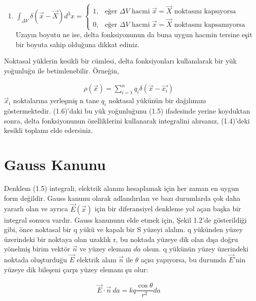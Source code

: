\begin{enumerate}
  \item $\int_{\Delta V} \delta(\Vec{x} - \Vec{X}) d^{3}x =   \begin{cases}
      1, & \text{eğer $\Delta V$ hacmi $\Vec{x} = \Vec{X}$ noktasını kapsıyorsa}\\
      0, & \text{eğer $\Delta V$ hacmi $\Vec{x} = \Vec{X}$ noktasını kapsamıyorsa}
    \end{cases}   $ \\
    Uzayın boyutu ne ise, delta fonksiyonunun da buna uygun hacmin tersine eşit bir boyuta sahip olduğuna dikkat ediniz.

\end{enumerate}

    Noktasal yüklerin kesikli bir cümlesi, delta fonksiyonları kullanılarak bir yük yoğunluğu ile betimlenebilir. Örneğin,

    \begin{align}
        \rho ( \Vec{x}) = \sum_{i=1}^{n} q_{i} \delta (\Vec{x} - \Vec{x_{i}})
    \end{align}
$\Vec{x}_{i}$ noktalarına yerleşmiş n tane $q_{i}$ noktasal yükünün bir dağılımını göstermektedir. (1.6)'daki bu yük yoğunluğunu (1.5) ifadesinde yerine koyduktan sonra, delta fonksiyonunun özelliklerini kullanarak integralini alırsanız, (1.4)'deki kesikli toplamı elde edersiniz.

\section{Gauss Kanunu}

Denklem (1.5) integrali, elektrik alanını hesaplamak için her zaman en uygun form değildir. Gauss kanunu olarak adlandırılan ve bazı durumlarda çok daha yararlı olan ve ayrıca $\Vec{E} (\Vec{x})$ için bir diferansiyel denkleme yol açan başka bir integral sonucu vardır. Gauss kanununu elde etmek için, Şekil 1.2'de gösterildiği gibi, önce noktasal bir q yükü ve kapalı bir S yüzeyi alalım. q yükünden yüzey üzerindeki bir noktaya olan uzaklık r, bu noktada yüzeye dik olan dışa doğru yönelmiş birim vektör $\Vec{n}$ ve yüzey elemanı $da$ olsun. q yükünün yüzey üzerindeki noktada oluşturduğu $\Vec{E}$ elektrik alanı $\Vec{n}$ ile $\theta$ açısı yapıyorsa, bu durumda $\Vec{E}$'nin yüzeye dik bileşeni çarpı yüzey elemanı şu olur:

\begin{align}
    \Vec{E} \cdot \Vec{n} \ da = k q \dfrac{\cos \theta}{r^{2}} da
\end{align}

